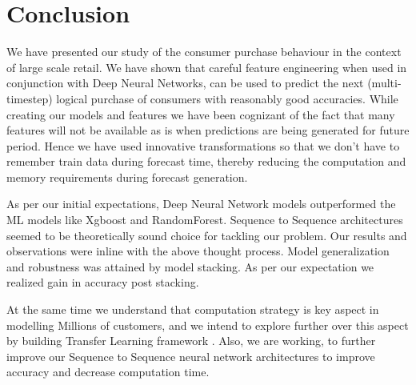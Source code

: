 \section{Conclusion}
\label{sec:conclusion}
We have presented our study of the consumer purchase behaviour in the context of large scale retail. 
We have shown that careful feature
engineering when used in conjunction with Deep Neural Networks, can be used
to predict the next (multi-timestep) logical purchase of consumers with reasonably good accuracies.
While creating our models and features we have been cognizant of
the fact that many features will not be available as is when predictions
are being generated for future period. Hence we have used innovative transformations so that we don’t have to remember train
data during forecast time, thereby reducing the computation and memory requirements during forecast generation.

As per our initial expectations, Deep Neural Network models outperformed the ML models like Xgboost and RandomForest.
Sequence to Sequence architectures seemed to be theoretically sound choice for tackling our problem. Our results and 
observations were inline with the above thought process. Model generalization and robustness
was attained by model stacking. As per our expectation we realized gain in accuracy post stacking.

At the same time we understand that computation strategy is key aspect in modelling
Millions of customers, and we intend to explore further over this aspect by building 
Transfer Learning framework \cite{yosinski2014transferable}. Also, we are working, to 
further improve our Sequence to Sequence neural network architectures to improve accuracy
and decrease computation time.
 

